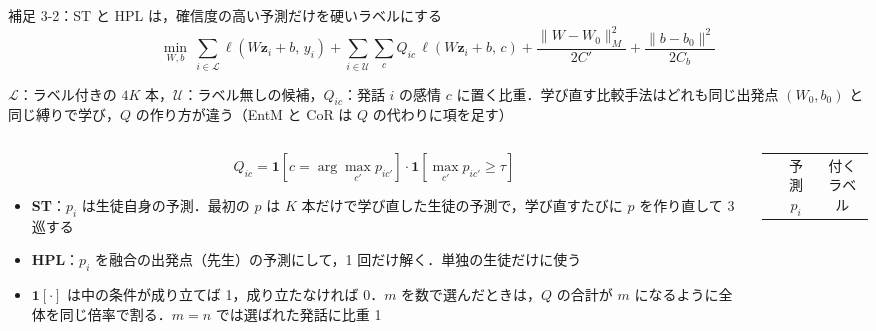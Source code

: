 \begin{frame}{補足 3-2：ST と HPL は，確信度の高い予測だけを硬いラベルにする}
  \vspace{-0.6em}
  {\small\tighteq
  \begin{equation*}
    \min_{W, b}\ \sum_{i \in \mathcal{L}} \ell(W\mathbf{z}_i + b,\, y_i) + \sum_{i \in \mathcal{U}} \sum_{c} Q_{ic}\, \ell(W\mathbf{z}_i + b,\, c) + \frac{\|W - W_0\|_M^2}{2C'} + \frac{\|b - b_0\|^2}{2C_b}
  \end{equation*}}
  \vspace{0.1em}
  {\raggedright\scriptsize $\mathcal{L}$：ラベル付きの $4K$ 本，$\mathcal{U}$：ラベル無しの候補，$Q_{ic}$：発話 $i$ の感情 $c$ に置く比重．学び直す比較手法はどれも同じ出発点 $(W_0, b_0)$ と同じ縛りで学び，$Q$ の作り方が違う（EntM と CoR は $Q$ の代わりに項を足す）\par}
  \vspace{0.2em}
  \begin{columns}[T,onlytextwidth]
    \begin{column}{0.52\textwidth}
      {\small\tighteq
      \begin{equation*}
        Q_{ic} = \mathbf{1}\!\left[c = \arg\max_{c'} p_{ic'}\right]\cdot \mathbf{1}\!\left[\max_{c'} p_{ic'} \ge \tau\right]
      \end{equation*}}
      \begin{itemize}\scriptsize\setlength{\itemsep}{3pt}
        \item \textbf{ST}：$p_i$ は生徒自身の予測．最初の $p$ は $K$ 本だけで学び直した生徒の予測で，学び直すたびに $p$ を作り直して 3 巡する
        \item \textbf{HPL}：$p_i$ を融合の出発点（先生）の予測にして，1 回だけ解く．単独の生徒だけに使う
        \item $\mathbf{1}[\cdot]$ は中の条件が成り立てば 1，成り立たなければ 0．$m$ を数で選んだときは，$Q$ の合計が $m$ になるように全体を同じ倍率で割る．$m = n$ では選ばれた発話に比重 1
      \end{itemize}
    \end{column}
    \begin{column}{0.45\textwidth}
      \centering\scriptsize
      \setlength{\tabcolsep}{3pt}
      \begin{tabular}{@{}c cccc cc@{}}
        \toprule
        & \multicolumn{4}{c}{予測 $p_i$} & \multicolumn{2}{c}{付くラベル} \\
        \cmidrule(lr){2-5}\cmidrule(l){6-7}

\end{tabular}
\end{column}
\end{columns}
\end{frame}
